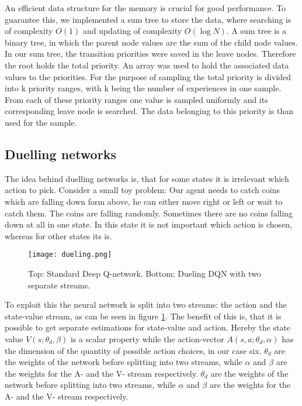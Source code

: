 \documentclass[12pt]{article}
\begin{document}
An efficient data structure for the memory is crucial for good performance.
To guarantee this, we implemented a sum tree to store the data, where searching is of complexity $O(1)$ and updating of complexity $O(\log N)$.
A sum tree is a binary tree, in which the parent node values are the sum of the child node values. In our sum tree, the transition priorities were saved in the leave nodes. Therefore the root holds the total priority. An array was used to hold the associated data values to the priorities. For the purpose of sampling the total priority is divided into k priority ranges, with k being the number of experiences in one sample.
From each of these priority ranges one value is sampled uniformly and its corresponding leave node is searched. The data belonging to this priority is than used for the sample.
\cite{DBLP:journals/corr/SchaulQAS15}
\subsection{Duelling networks}
The idea behind duelling networks is, that for some states it is irrelevant which action to pick.
Consider a small toy problem: Our agent needs to catch coins which are falling down form above, he can either move right or left or wait to catch them. The coins are falling randomly. Sometimes there are no coins falling down at all in one state. In this state it is not important which action is chosen, whereas for other states its is.
\begin{figure}
\centering
\texttt{[image: dueling.png]}
\caption{Top: Standard Deep Q-network. Bottom: Dueling DQN with two separate streams.\cite{DBLP:journals/corr/WangFL15}}
\label{fig: dueling}
\end{figure}
To exploit this the neural network is split into two streams: 
the action and the state-value stream, as can be seen in figure \ref{fig: dueling}. The benefit of this is, that it is possible to get separate estimations for state-value and action. Hereby the state value $V(s ; \theta_d, \beta)$ is a scalar property while the action-vector $A(s, a ; \theta_d, \alpha)$ has the dimension of the quantity of possible action choices, in our case six. $\theta_d$ are the weights of the network before splitting into two streams, while $\alpha$ and $\beta$ are the weights for the A- and the V- stream respectively.
$\theta_d$ are the weights of the network before splitting into two streams, while $\alpha$ and $\beta$ are the weights for the A- and the V- stream respectively.
\end{document}
